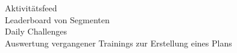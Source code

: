 Aktivitätsfeed \\
Leaderboard von Segmenten \\
Daily Challenges \\
Auswertung vergangener Trainings zur Erstellung eines Plans